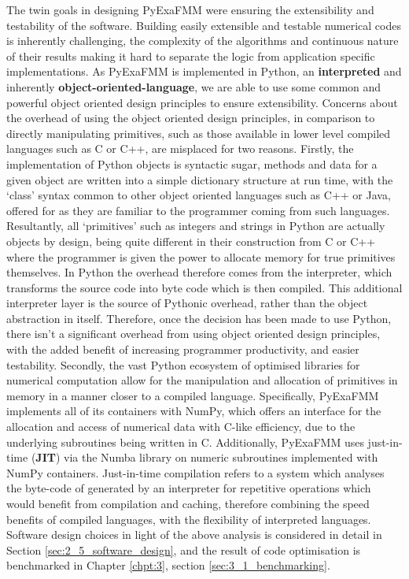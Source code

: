 The twin goals in designing \gls{PyExaFMM} were ensuring the extensibility and
testability of the software. Building easily extensible and testable numerical
codes is inherently challenging, the complexity of the algorithms and continuous
nature of their results making it hard to separate the logic from application
specific implementations. As \gls{PyExaFMM} is implemented in Python, an
\textbf{\gls{interpreted}} and inherently \textbf{\gls{object-oriented-language}}, we are able to use some common and powerful
object oriented design principles to ensure extensibility. Concerns about the
overhead of using the object oriented design principles, in comparison to directly manipulating
primitives, such as those available in lower level compiled languages such as C
or C++, are misplaced for two reasons. Firstly, the implementation of Python objects
is syntactic sugar, methods and data for a given object are written into
a simple dictionary structure at run time, with the `class' syntax common to other
object oriented languages such as C++ or Java, offered for as they are familiar to
the programmer coming from such languages. Resultantly, all `primitives' such as
integers and strings in Python are actually objects by design, being quite different
in their construction from C or C++ where the programmer is given the power to
allocate memory for true primitives themselves. In Python the overhead therefore
comes from the interpreter, which transforms the source code into byte code which
is then compiled. This additional interpreter layer is the source of Pythonic overhead,
rather than the object abstraction in itself. Therefore, once the decision has
been made to use Python, there isn't a significant overhead from using object
oriented design principles, with the added benefit of increasing programmer
productivity, and easier testability. Secondly, the vast Python ecosystem of
optimised libraries for numerical computation allow for the manipulation and
allocation of primitives in memory in a manner closer to a compiled language.
Specifically, \gls{PyExaFMM} implements all of its containers with NumPy, which
offers an interface for the allocation and access of numerical data with C-like
efficiency, due to the underlying subroutines being written in C. Additionally,
\gls{PyExaFMM} uses just-in-time (\textbf{\gls{JIT}}) via the Numba library on
numeric subroutines implemented with NumPy containers. Just-in-time compilation
refers to a system which analyses the byte-code of generated by an interpreter
for repetitive operations which would benefit from compilation and caching, therefore
combining the speed benefits of compiled languages, with the flexibility of interpreted
languages. Software design choices in light of the above analysis is considered
in detail in Section \ref{sec:2_5_software_design}, and the result of code
optimisation is benchmarked in Chapter \ref{chpt:3}, section \ref{sec:3_1_benchmarking}.

